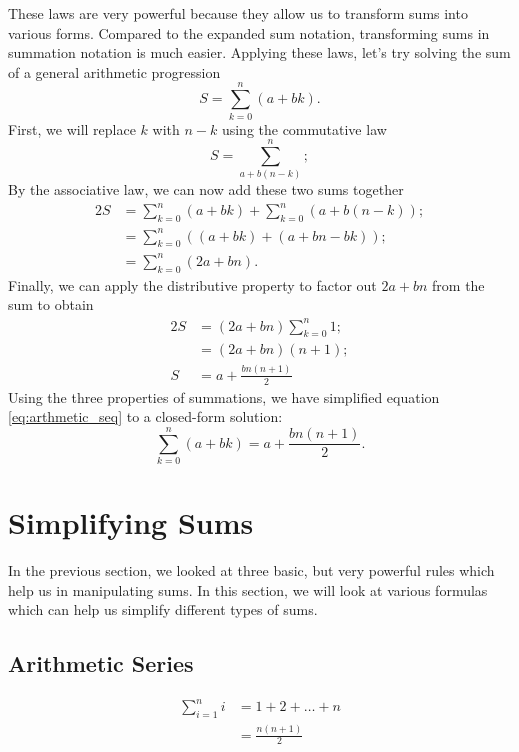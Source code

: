 \documentclass[prereq]{cslesson}
\numberwithin{equation}{section}
\begin{document}
These laws are very powerful because they allow us to transform sums into various forms. Compared to the expanded sum notation, transforming sums in summation notation is much easier. Applying these laws, let's try solving the sum of a general arithmetic progression
\begin{equation}
    S=\sum^n_{k=0}(a+bk).
    \label{eq:arthmetic_seq}
\end{equation}
First, we will replace $k$ with $n-k$ using the commutative law
\begin{equation*}
    S=\sum^n_{a+b(n-k)};
\end{equation*}
By the associative law, we can now add these two sums together
\begin{align*}
    2S&=\sum^n_{k=0}(a+bk)+\sum^n_{k=0}(a+b(n-k));\\
    &=\sum^n_{k=0}((a+bk)+(a+bn-bk));\\
    &=\sum^n_{k=0}(2a+bn).
\end{align*}
Finally, we can apply the distributive property to factor out $2a+bn$ from the sum to obtain
\begin{align*}
    2S&=(2a+bn)\sum^n_{k=0}1;\\
    &=(2a+bn)(n+1);\\
    S&=a+\frac{bn(n+1)}{2}
\end{align*}
Using the three properties of summations, we have simplified equation \ref{eq:arthmetic_seq} to a closed-form solution:
\begin{equation*}
    \sum^n_{k=0}(a+bk)=a+\frac{bn(n+1)}{2}.
\end{equation*}

\section{Simplifying Sums}
In the previous section, we looked at three basic, but very powerful rules which help us in manipulating sums. In this section, we will look at various formulas which can help us simplify different types of sums.

\subsection{Arithmetic Series}
\begin{theorem}
\begin{align*}
    \sum^n_{i=1}i&=1+2+\ldots+n\\
    &=\frac{n(n+1)}{2}
\end{align*}
\end{theorem}
\end{document}
